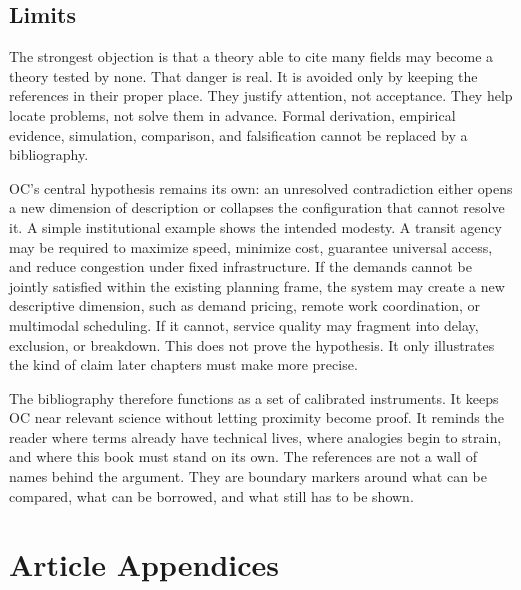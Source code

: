 \documentclass[11pt,a4paper,openany]{book}
\begin{document}
\subsection{Limits}
The strongest objection is that a theory able to cite many fields may become a theory tested by none. That danger is real. It is avoided only by keeping the references in their proper place. They justify attention, not acceptance. They help locate problems, not solve them in advance. Formal derivation, empirical evidence, simulation, comparison, and falsification cannot be replaced by a bibliography. \cite{kauffman_autocatalytic,raf_networks}\par
OC's central hypothesis remains its own: an unresolved contradiction either opens a new dimension of description or collapses the configuration that cannot resolve it. A simple institutional example shows the intended modesty. A transit agency may be required to maximize speed, minimize cost, guarantee universal access, and reduce congestion under fixed infrastructure. If the demands cannot be jointly satisfied within the existing planning frame, the system may create a new descriptive dimension, such as demand pricing, remote work coordination, or multimodal scheduling. If it cannot, service quality may fragment into delay, exclusion, or breakdown. This does not prove the hypothesis. It only illustrates the kind of claim later chapters must make more precise.\par
The bibliography therefore functions as a set of calibrated instruments. It keeps OC near relevant science without letting proximity become proof. It reminds the reader where terms already have technical lives, where analogies begin to strain, and where this book must stand on its own. The references are not a wall of names behind the argument. They are boundary markers around what can be compared, what can be borrowed, and what still has to be shown.\par
\section{Article Appendices}
\end{document}
